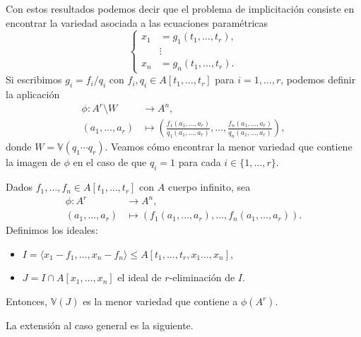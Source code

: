 Con estos resultados podemos decir que el problema de implicitación consiste en encontrar la variedad asociada a las ecuaciones paramétricas
\begin{equation*}
    \begin{cases}
    x_1 &= g_1(t_1,\dots, t_r),\\
    &\vdots \label{eq:paramEq} \\
    x_n &= g_n(t_1,\dots, t_r).
    \end{cases}
\end{equation*}
Si escribimos $g_i = f_i/q_i$ con $f_i,q_i \in A[t_1,\dots, t_r]$ para $i=1,\dots, r$, podemos definir la aplicación
\begin{align*}
        \phi \colon A^r\setminus W  & \to A^n,\\
        (a_1,\dots, a_r) & \mapsto \left( \frac{f_1(a_1,\dots, a_r)}{q_1(a_1,\dots, a_r)}, \dots, \frac{f_n(a_1,\dots, a_r)}{q_n(a_1,\dots, a_r)}\right),
    \end{align*}
donde $W=\mathbb{V}(q_1\cdots q_r)$. Veamos cómo encontrar la menor variedad que contiene la imagen de $\phi$ en el caso de que $q_i = 1$ para cada $i\in \{1,\dots, r\}$. 
\begin{teorema}\label{t:implicit}
    Dados $f_1,\dots, f_n \in A[t_1, \dots, t_r]$ con $A$ cuerpo infinito, sea
    \begin{align*}
        \phi \colon A^r  & \to A^n,\\
        (a_1,\dots, a_r) & \mapsto \left( f_1(a_1,\dots, a_r), \dots, f_n(a_1,\dots, a_r) \right).
    \end{align*}
    Definimos los ideales:
    \begin{itemize}
        \item $I = \langle x_1-f_1,\dots,  x_n-f_n\rangle \le A[t_1,\dots, t_r,x_1\dots, x_n]$,
        \item $J = I\cap A[x_1,\dots, x_n]$ el ideal de $r$-eliminación de $I$.
    \end{itemize}
    Entonces, $\mathbb{V}(J)$ es la menor variedad que contiene a $\phi(A^r)$.
\end{teorema}
La extensión al caso general es la siguiente.
